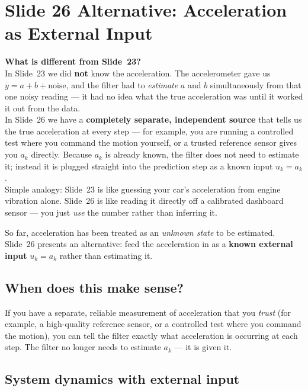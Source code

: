 \documentclass[12pt, a4paper]{article}
\begin{document}
\clearpage
\section*{Slide 26 \quad Alternative: Acceleration as External Input}

\begin{notebox}
  \textbf{What is different from Slide~23?}\\
  In Slide~23 we did \textbf{not} know the acceleration.
  The accelerometer gave us $y = a + b + \text{noise}$, and the filter
  had to \emph{estimate} $a$ and $b$ simultaneously from that one
  noisy reading --- it had no idea what the true acceleration was
  until it worked it out from the data.\\[4pt]
  In Slide~26 we have a \textbf{completely separate, independent
  source} that tells us the true acceleration at every step ---
  for example, you are running a controlled test where you command
  the motion yourself, or a trusted reference sensor gives you $a_k$
  directly.
  Because $a_k$ is already known, the filter does not need to estimate
  it; instead it is plugged straight into the prediction step as a
  known input $u_k = a_k$.\\[4pt]
  Simple analogy: Slide~23 is like guessing your car's acceleration
  from engine vibration alone.
  Slide~26 is like reading it directly off a calibrated dashboard
  sensor --- you just \emph{use} the number rather than inferring it.
\end{notebox}

So far, acceleration has been treated as an \emph{unknown state} to
be estimated.
Slide~26 presents an alternative: feed the acceleration in as a
\textbf{known external input} $u_k = a_k$ rather than estimating it.

\subsection*{When does this make sense?}

If you have a separate, reliable measurement of acceleration that you
\emph{trust} (for example, a high-quality reference sensor, or a
controlled test where you command the motion), you can tell the
filter exactly what acceleration is occurring at each step.
The filter no longer needs to estimate $a_k$ --- it is given it.

\subsection*{System dynamics with external input}
\end{document}
